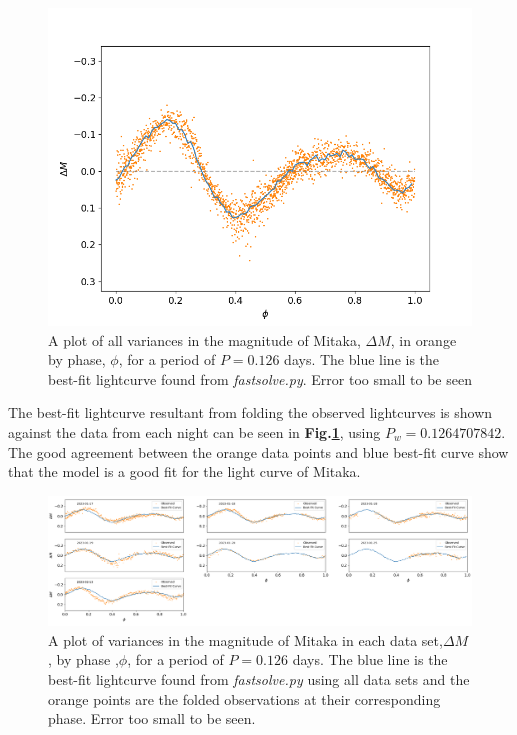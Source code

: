 \documentclass[10pt,twocolumn]{revtex4}    %
\newcommand{\reffig}[1]{\textbf{Fig.#1}}
\begin{document}
\begin{figure}
    \centering
    \includegraphics[width = \linewidth]{FastSolveAllCurve.png}
    \caption{A plot of all variances in the magnitude of Mitaka, $\Delta M$, in orange by phase, $\phi$, for a period of $P = 0.126$ days. The blue line is the best-fit lightcurve found from \textit{fastsolve.py}. Error too small to be seen}
    \label{fig:bestLC}
\end{figure}

The best-fit lightcurve resultant from folding the observed lightcurves is shown against the data from each night can be seen in \reffig{\ref{fig:bestLC}}, using $P_w = 0.1264707842$. The good agreement between the orange data points and blue best-fit curve show that the model is a good fit for the light curve of Mitaka.

\begin{figure}\label{FastSolveAllEntire}
\centering
  \includegraphics[width = \linewidth]{FastSolveAllEntire.png}
  \caption{A plot of variances in the magnitude of Mitaka in each data set,$\Delta M$, by phase ,$\phi$, for a period of $P = 0.126$ days. The blue line is the best-fit lightcurve found from \textit{fastsolve.py} using all data sets and the orange points are the folded observations at their corresponding phase. Error too small to be seen.}
\end{figure}
\end{document}
